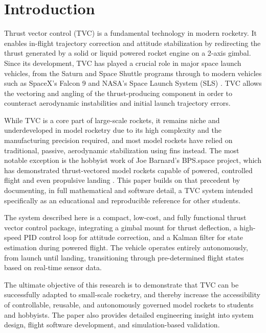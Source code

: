 \section{Introduction}

Thrust vector control (TVC) is a fundamental technology in modern rocketry. It enables in-flight
trajectory correction and attitude stabilization by redirecting the thrust generated by a solid or
liquid powered rocket engine on a 2-axis gimbal. Since its development, TVC has played a crucial role in major space launch vehicles, from the Saturn and Space Shuttle programs through to modern vehicles such as SpaceX's Falcon 9 and NASA's Space Launch System (SLS) \cite{nasa_tvc_sls}. TVC allows the vectoring and angling of the thrust-producing component in order to counteract aerodynamic instabilities and initial launch trajectory errors.

While TVC is a core part of large-scale rockets, it remains niche and underdeveloped in model rocketry due to its high complexity and the manufacturing precision required, and most model rockets have relied on traditional, passive, aerodynamic stabilization using fins instead. The most notable exception is the hobbyist work of Joe Barnard's BPS.space project, which has demonstrated thrust-vectored model rockets capable of powered, controlled flight and even propulsive landing \cite{bpsspace}. This paper builds on that precedent by documenting, in full mathematical and software detail, a TVC system intended specifically as an educational and reproducible reference for other students.

The system described here is a compact, low-cost, and fully functional thrust vector control package, integrating a gimbal mount for thrust deflection, a high-speed PID control loop for attitude correction, and a Kalman filter for state estimation during powered flight. The vehicle operates entirely autonomously, from launch until
landing, transitioning through pre-determined flight states based on real-time sensor data.

The ultimate objective of this research is to demonstrate that TVC can be successfully adapted to
small-scale rocketry, and thereby increase the accessibility of controllable, reusable, and
autonomously governed model rockets to students and hobbyists. The paper also provides detailed
engineering insight into system design, flight software development, and simulation-based validation.
